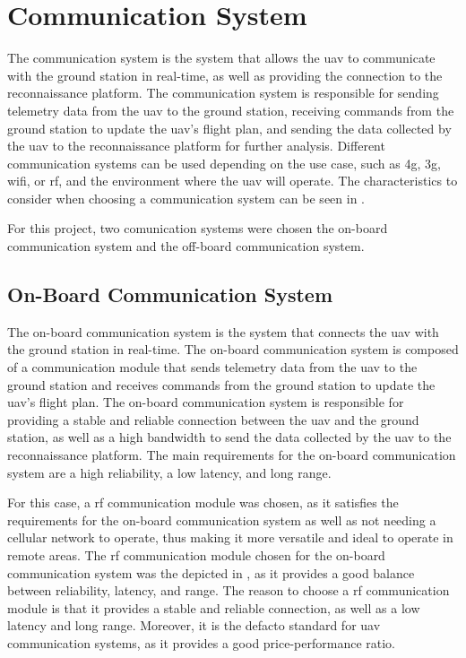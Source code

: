 \section{Communication System}\label{sec:communication_system}

The communication system is the system that allows the \gls{uav} to communicate with the ground station in real-time, as well as providing the connection to the reconnaissance platform. The communication system is responsible for sending telemetry data from the \gls{uav} to the ground station, receiving commands from the ground station to update the \gls{uav}'s flight plan, and sending the data collected by the \gls{uav} to the reconnaissance platform for further analysis. Different communication systems can be used depending on the use case, such as \gls{4g}, \gls{3g}, \gls{wifi}, or \gls{rf}, and the environment where the \gls{uav} will operate. The characteristics to consider when choosing a communication system can be seen in .


For this project, two comunication systems were chosen the on-board communication system and the off-board communication system.

\subsection{On-Board Communication System}\label{subsec:on-board_communication_system}

The on-board communication system is the system that connects the \gls{uav} with the ground station in real-time. The on-board communication system is composed of a communication module that sends telemetry data from the \gls{uav} to the ground station and receives commands from the ground station to update the \gls{uav}'s flight plan. The on-board communication system is responsible for providing a stable and reliable connection between the \gls{uav} and the ground station, as well as a high bandwidth to send the data collected by the \gls{uav} to the reconnaissance platform. The main requirements for the on-board communication system are a high reliability, a low latency, and long range.

For this case, a \gls{rf} communication module was chosen, as it satisfies the requirements for the on-board communication system as well as not needing a cellular network to operate, thus making it more versatile and ideal to operate in remote areas. The \gls{rf} communication module chosen for the on-board communication system was the  depicted in , as it provides a good balance between reliability, latency, and range. The reason to choose a \gls{rf} communication module is that it provides a stable and reliable connection, as well as a low latency and long range. Moreover, it is the defacto standard for \gls{uav} communication systems, as it provides a good price-performance ratio.

